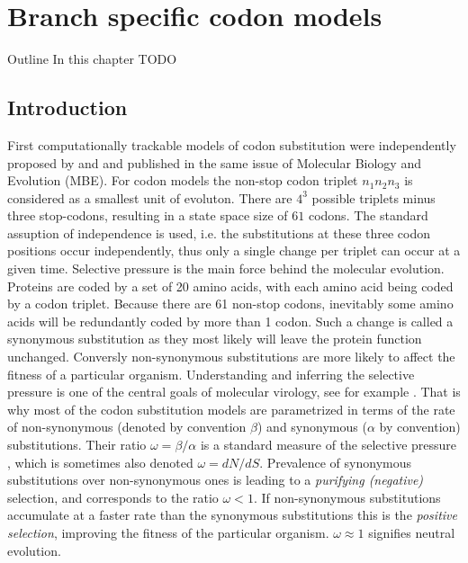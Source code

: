 \chapter{Branch specific codon models\label{chap:dpp}}

\begin{remark}{Outline}
In this chapter
TODO
\end{remark}

\section{Introduction}

First computationally trackable models of codon substitution were independently proposed by \cite{Muse1994} and \cite{Goldman1994} and published in the same issue of Molecular Biology and Evolution (MBE).
For codon models the non-stop codon triplet $n_{1}n_{2}n_{3}$ is considered as a smallest unit of evoluton.
There are $4^3$ possible triplets minus three stop-codons, resulting in a state space size of $61$ codons.
The standard assuption of independence is used, i.e. the substitutions at these three codon positions occur independently, thus only a single change per triplet can occur at a given time.
Selective pressure is the main force behind the molecular evolution.
Proteins are coded by a set of 20 amino acids, with each amino acid being coded by a codon triplet. 
Because there are 61 non-stop codons, inevitably some amino acids will be redundantly coded by more than 1 codon.
Such a change is called a synonymous substitution as they most likely will leave the protein function unchanged.
Conversly non-synonymous substitutions are more likely to affect the fitness of a particular organism.
Understanding and inferring the selective pressure is one of the central goals of molecular virology, see for example \citet{Bielejec2014a}.
That is why most of the codon substitution models are parametrized in terms of the rate of non-synonymous (denoted by convention $\beta$) and synonymous ($\alpha$ by convention) substitutions.
Their ratio $\omega=\beta / \alpha$ is a standard measure of the selective pressure \citep{ThePhylogeneticHandbook}, which is sometimes also denoted $\omega = dN/dS$.
Prevalence of synonymous substitutions over non-synonymous ones is leading to a \emph{purifying (negative)} selection, and corresponds to the ratio $\omega <1$.
If non-synonymous substitutions accumulate at a faster rate than the synonymous substitutions this is the \emph{positive selection}, improving the fitness of the particular organism.
$\omega\approx1$ signifies neutral evolution.

